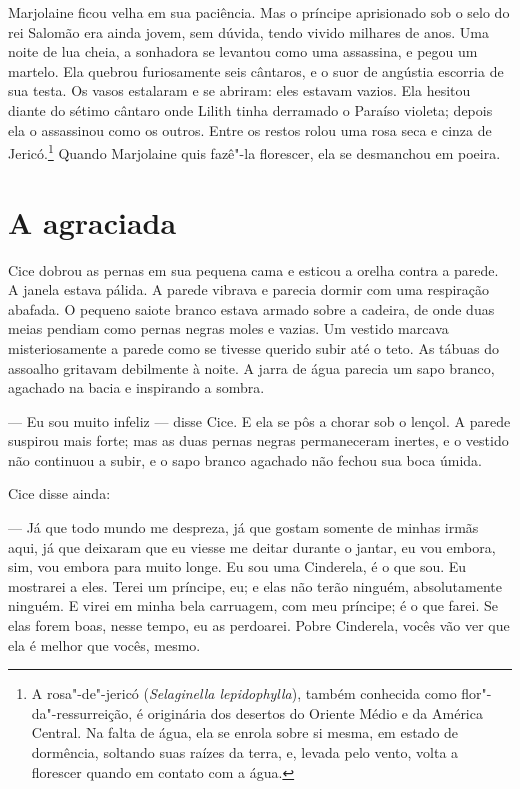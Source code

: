 Marjolaine ficou velha em sua paciência. Mas o príncipe aprisionado sob
o selo do rei Salomão era ainda jovem, sem dúvida, tendo vivido milhares
de anos. Uma noite de lua cheia, a sonhadora se levantou como uma
assassina, e pegou um martelo. Ela quebrou furiosamente seis cântaros, e o
suor de angústia escorria de sua testa. Os vasos estalaram e se abriram:
eles estavam vazios. Ela hesitou diante do sétimo cântaro onde Lilith
tinha derramado o Paraíso violeta; depois ela o assassinou como os outros.
Entre os restos rolou uma rosa seca e cinza de Jericó.\footnote{ A rosa"-de"-jericó 
(\textit{Selaginella lepidophylla}), também conhecida como flor"-da"-ressurreição, é originária dos
desertos do Oriente Médio e da América Central. Na falta
de água, ela se enrola sobre si mesma, em estado de dormência, soltando
suas raízes da terra, e, levada pelo vento, volta a florescer quando em
contato com a água.} Quando Marjolaine quis fazê"-la florescer, ela se
desmanchou em poeira.

\section*{A agraciada}

Cice dobrou as pernas em sua pequena cama e esticou a orelha contra a
parede. A janela estava pálida. A parede vibrava e parecia dormir com uma
respiração abafada. O pequeno saiote branco estava armado sobre a cadeira,
de onde duas meias pendiam como pernas negras moles e vazias. Um vestido
marcava misteriosamente a parede como se tivesse querido subir até o teto.
As tábuas do assoalho gritavam debilmente à noite. A
jarra de água parecia um sapo branco, agachado na bacia e inspirando a
sombra.

--- Eu sou muito infeliz --- disse Cice. E ela se pôs a chorar sob o
lençol. A parede suspirou mais forte; mas as duas pernas negras
permaneceram inertes, e o vestido não continuou a subir, e o sapo branco
agachado não fechou sua boca úmida.

Cice disse ainda:

--- Já que todo mundo me despreza, já que gostam somente de minhas irmãs
aqui, já que deixaram que eu viesse me deitar durante o jantar, eu vou
embora, sim, vou embora para muito longe. Eu sou uma Cinderela, é o que
sou. Eu mostrarei a eles. Terei um príncipe, eu; e elas não terão ninguém,
absolutamente ninguém. E virei em minha bela carruagem, com meu príncipe;
é o que farei. Se elas forem boas, nesse tempo, eu as perdoarei. Pobre
Cinderela, vocês vão ver que ela é melhor que vocês, mesmo.

